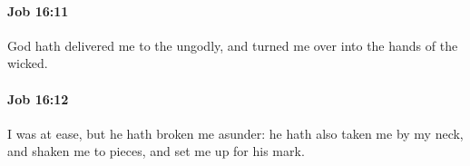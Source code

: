 		\paragraph{Job 16:11} %
			\label{JOB-16-11}

			God hath delivered me to the ungodly, and turned me over into the hands of the wicked.


		\paragraph{Job 16:12} %
			\label{JOB-16-12}

			I was at ease, but he hath broken me asunder: he hath also taken me by my neck, and shaken me to pieces, and set me up for his mark.


